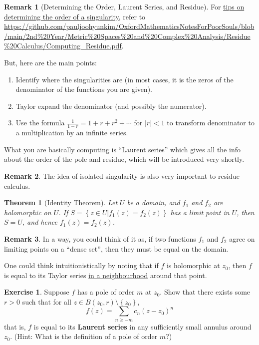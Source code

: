 \documentclass[a4paper, 12pt]{article}
\newtheorem{theorem}{Theorem}
\theoremstyle{definition}
\newtheorem{exercise}{Exercise}
\newtheorem{remark}{Remark}
\numberwithin{theorem}{section}
\numberwithin{definition}{section}
\numberwithin{exercise}{section}
\numberwithin{remark}{section}
\numberwithin{figure}{section}
\numberwithin{example}{section}
\begin{document}
\begin{remark}[Determining the Order, Laurent Series, and Residue]
    For \ul{tips on determining the order of a singularity}, refer to \url{https://github.com/pauljoohyunkim/OxfordMathematicsNotesForPoorSouls/blob/main/2nd\%20Year/Metric\%20Spaces\%20and\%20Complex\%20Analysis/Residue\%20Calculus/Computing\_Residue.pdf}.

    But, here are the main points:
    \begin{enumerate}
        \item Identify where the singularities are (in most cases, it is the zeros of the denominator of the functions you are given).
        \item Taylor expand the denominator (and possibly the numerator).
        \item Use the formula $\frac{1}{1-r} = 1 + r + r^2 + \cdots$ for $|r| < 1$ to transform denominator to a multiplication by an infinite series.
    \end{enumerate}
    What you are basically computing is ``Laurent series'' which gives all the info about the order of the pole and residue,
    which will be introduced very shortly.
\end{remark}
\begin{remark}
    The idea of isolated singularity is also very important to residue calculus.
\end{remark}
\begin{theorem}[Identity Theorem]
    Let $U$ be a domain, and $f_1$ and $f_2$ are holomorphic on $U$.
    If $S = \left\{ z \in U | f_1(z) = f_2 (z) \right\}$ has a limit point in $U$,
    then $S = U$, and hence $f_1(z) = f_2 (z)$.
\end{theorem}
\begin{remark}
    In a way, you could think of it as, if two functions $f_1$ and $f_2$ agree on limiting points on a ``dense set'',
    then they must be equal on the domain.

    One could think intuitionistically by noting that if $f$ is holomorphic at $z_0$, then
    $f$ is equal to its Taylor series \ul{in a neighbourhood} around that point.
\end{remark}
\begin{exercise}
    Suppose $f$ has a pole of order $m$ at $z_0$.
    Show that there exists some $r > 0$ such that for all $z \in B\left( z_0, r \right) \setminus\left\{ z_0 \right\}$,
    \begin{equation*}
        f(z) = \sum_{n \geq -m} c_n (z-z_0)^n
    \end{equation*}
    that is,
    $f$ is equal to its \textbf{Laurent series} in any sufficiently small annulus around $z_0$.
    (Hint: What is the definition of a pole of order $m$?)
\end{exercise}
\end{document}
